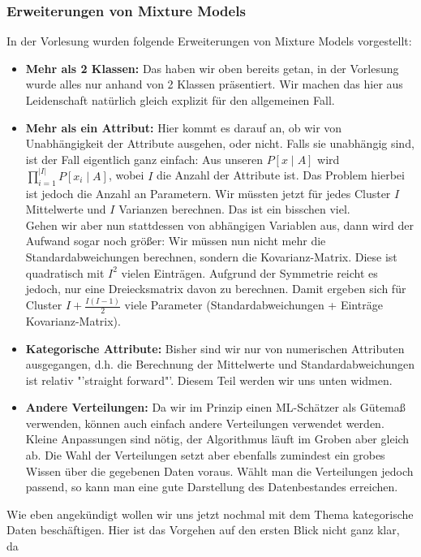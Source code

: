 \subsubsection{Erweiterungen von Mixture Models}
In der Vorlesung wurden folgende Erweiterungen von Mixture Models vorgestellt:
\begin{itemize}
\item \textbf{Mehr als 2 Klassen:} Das haben wir oben bereits getan, in der
Vorlesung wurde alles nur anhand von 2 Klassen präsentiert. Wir machen das hier 
aus Leidenschaft natürlich gleich explizit für den allgemeinen Fall.
\item \textbf{Mehr als ein Attribut:} Hier kommt es darauf an, ob wir von
Unabhängigkeit der Attribute ausgehen, oder nicht. Falls sie unabhängig sind,
ist der Fall eigentlich ganz einfach: Aus unseren \(P[x \mid A]\) wird 
\(\prod_{i=1}^{|I|} P[x_i \mid A]\), wobei \(I\) die Anzahl der
Attribute ist. Das Problem hierbei ist jedoch die
Anzahl an Parametern. Wir müssten jetzt für jedes Cluster \(I\) Mittelwerte
und \(I\) Varianzen berechnen. Das ist ein bisschen viel.\\
Gehen wir aber nun stattdessen von abhängigen Variablen aus, dann wird 
der Aufwand sogar noch größer: Wir müssen nun nicht mehr die Standardabweichungen
berechnen, sondern die Kovarianz-Matrix. Diese ist quadratisch mit \(I^2\) vielen
Einträgen. Aufgrund der Symmetrie reicht es jedoch, nur eine Dreiecksmatrix davon
zu berechnen. Damit ergeben sich für Cluster \(I + \frac{I(I-1)}{2}\) viele 
Parameter (Standardabweichungen + Einträge Kovarianz-Matrix).
\item \textbf{Kategorische Attribute:} Bisher sind wir nur von numerischen
Attributen ausgegangen, d.h. die Berechnung der Mittelwerte und 
Standardabweichungen ist relativ "'straight forward"'. Diesem Teil werden wir uns unten
widmen.
\item \textbf{Andere Verteilungen:} Da wir im Prinzip einen ML-Schätzer als
Gütemaß verwenden, können auch einfach andere Verteilungen verwendet werden.
Kleine Anpassungen sind nötig, der Algorithmus läuft im Groben aber gleich ab.
Die Wahl der Verteilungen setzt aber ebenfalls zumindest ein grobes Wissen über 
die gegebenen Daten voraus. Wählt man die Verteilungen jedoch passend, so 
kann man eine gute Darstellung des Datenbestandes erreichen.
\end{itemize}
Wie eben angekündigt wollen wir uns jetzt nochmal mit dem Thema kategorische
Daten beschäftigen. Hier ist das Vorgehen auf den ersten Blick nicht ganz klar, da
